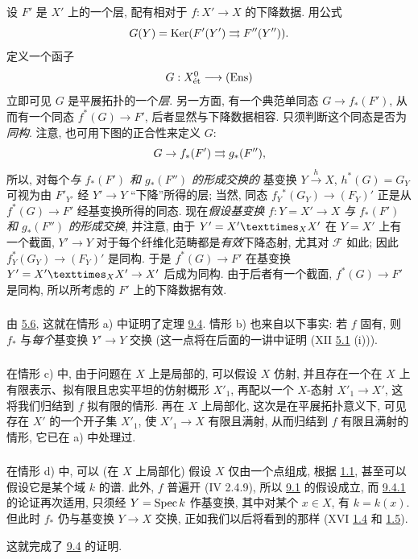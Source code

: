 设 $F'$ 是 $X'$ 上的一个层,
配有相对于 $f:X'\rightarrow X$ 的下降数据.
用公式
$$
G(Y)=\operatorname{Ker} (F'(Y')\rightrightarrows F''(Y'')){}.
$$
定义一个函子
$$
G:X^{0}_{\text{\rm ét}}\longrightarrow (\operatorname{Ens})
$$
立即可见 $G$ 是平展拓扑的一个\emph{层}.
另一方面, 有一个典范单同态 $G\rightarrow f_{\ast}(F')$,
从而有一个同态 $f^{\ast}(G)\rightarrow F'$,
后者显然与下降数据相容.
只须判断这个同态是否为\emph{同构}.
注意, 也可用下图的正合性来定义 $G$:
$$
G\rightarrow f_{\ast}(F')\rightrightarrows g_{\ast}(F''){},
$$
所以, 对每个\emph{与 $f_{\ast}(F')$ 和 $g_{\ast}(F'')$ 的形成交换的}
基变换 $Y\xrightarrow{h}X$,
$h^{\ast}(G)=G_{Y}$ 可视为由 $F'_{Y'}$
经 $Y'\rightarrow Y$ “下降”所得的层;
当然, 同态 $f_{Y}{}^{\ast}(G_{Y})\rightarrow (F_{Y})'$
正是从 $f^{\ast}(G)\rightarrow F'$ 经基变换所得的同态.
现在\emph{假设基变换} $f:Y=X'\rightarrow X$
\emph{与 $f_{\ast}(F')$ 和 $g_{\ast}(F'')$ 的形成交换},
并注意, 由于 $Y'=\fprod{X'}{X'}{X}$ 在 $Y=X'$ 上有一个截面,
$Y'\rightarrow Y$ 对于每个纤维化范畴都是\emph{有效}下降态射,
尤其对 $\mathcal{F}$ 如此;
因此 $f^{\ast}_{Y}(G_{Y})\rightarrow (F_{Y})'$ 是同构.
于是 $f^{\ast}(G)\rightarrow F'$ 在基变换
$Y'=\fprod{X'}{X'}{X}\rightarrow X'$ 后成为同构.
由于后者有一个截面, $f^{\ast}(G)\rightarrow F'$ 是同构,
所以所考虑的 $F'$ 上的下降数据\pageoriginale 有效.

\subsubsection{}

由 \hyperref[VIII.cor5.6]{5.6},
这就在情形 a) 中证明了定理 \hyperref[VIII.thm9.4]{9.4}.
情形 b) 也来自以下事实:
若 $f$ 固有, 则 $f_{\ast}$ 与\emph{每个}基变换 $Y'\rightarrow Y$ 交换
(这一点将在后面的一讲中证明 (XII \hyperref[XII.thm5.1]{5.1} (i))).

\subsubsection{}

在情形 c) 中, 由于问题在 $X$ 上是局部的,
可以假设 $X$ 仿射, 并且存在一个在 $X$ 上有限表示、拟有限且忠实平坦的仿射概形 $X'_{1}$,
再配以一个 $X$-态射 $X'_{1}\rightarrow X'$,
这将我们归结到 $f$ 拟有限的情形.
再在 $X$ 上局部化, 这次是在平展拓扑意义下,
可见存在 $X'$ 的一个开子集 $X'_{1}$,
使 $X'_{1}\rightarrow X$ 有限且满射,
从而归结到 $f$ 有限且满射的情形, 它已在 a) 中处理过.

\subsubsection{}
在情形 d) 中, 可以 (在 $X$ 上局部化) 假设 $X$ 仅由一个点组成,
根据 \hyperref[VIII.thm1.1]{1.1}, 甚至可以假设它是某个域 $k$ 的谱.
此外, $f$ 普遍开 (\EGA IV 2.4.9),
所以 \hyperref[VIII.prop9.1]{9.1} 的假设成立,
而 \hyperref[VIII.subsubsec9.4.1]{9.4.1} 的论证再次适用,
只须经 $Y=\operatorname{Spec} k$ 作基变换, 其中对某个 $x\in X$, 有 $k=k(x)$.
但此时 $f_{\ast}$ 仍与基变换 $Y\rightarrow X$ 交换,
正如我们以后将看到的那样
(XVI \hyperref[XVI.compl1.4]{1.4} 和 \hyperref[XVI.cor1.5]{1.5}).

这就完成了 \hyperref[VIII.thm9.4]{9.4} 的证明.


\ifx\danslelivre\undefined

\fi



